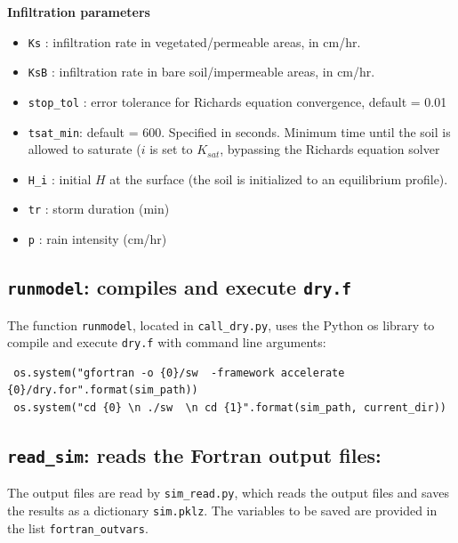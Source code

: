 \documentclass{article}
\newcommand{\code}[1]{\texttt{#1}}
\begin{document}
\textbf{Infiltration parameters}
\begin{itemize}
	\item \code{Ks} : infiltration rate in vegetated/permeable areas, in cm/hr.  
	\item \code{KsB} : infiltration rate in bare soil/impermeable areas, in cm/hr.
	
	\item \code{stop\_tol} : error tolerance for Richards equation convergence,	default = 0.01

	\item \code{tsat\_min}: default = 600.  Specified in seconds.  Minimum time until the soil is allowed to saturate ($i$ is set to $K_{sat}$, bypassing the Richards equation solver
	\item \code{H\_i} : initial $H$ at the surface (the soil is initialized to an equilibrium profile).

	\item \code{tr} : storm duration (min)
	\item \code{p} : rain intensity (cm/hr)
\end{itemize}


\subsection{\code{runmodel}: compiles and execute \code{dry.f}}
The function \code{runmodel}, located in \code{call\_dry.py}, uses the Python os library to compile and execute \code{dry.f} with command line arguments: 

\begin{verbatim}
 os.system("gfortran -o {0}/sw  -framework accelerate {0}/dry.for".format(sim_path))
 os.system("cd {0} \n ./sw  \n cd {1}".format(sim_path, current_dir))	
\end{verbatim}

    
\subsection{\code{read\_sim}: reads the Fortran output files: }

The output files are read by \code{sim\_read.py}, which reads the output files and saves the results as a dictionary  \code{sim.pklz}.  The variables to be saved are provided in the list \code{fortran\_outvars}.
\end{document}
